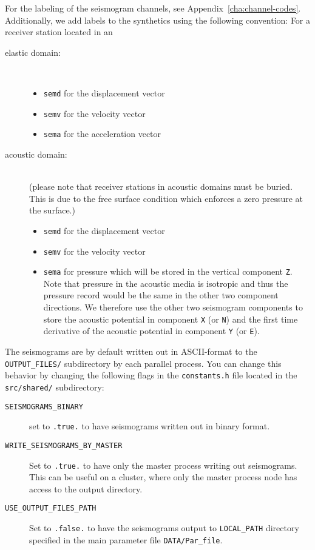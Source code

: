 For the labeling of the seismogram channels, see Appendix~\ref{cha:channel-codes}.
Additionally, we add labels to the synthetics using the following
convention: For a receiver station located in an
\begin{description}
\item [{elastic domain:}] ~
\begin{itemize}
\item \texttt{semd} for the displacement vector
\item \texttt{semv} for the velocity vector
\item \texttt{sema} for the acceleration vector
\end{itemize}
\item [{acoustic domain:}] ~\\
 (please note that receiver stations in acoustic domains must be buried.
This is due to the free surface condition which enforces a zero pressure
at the surface.)
\begin{itemize}
\item \texttt{semd} for the displacement vector
\item \texttt{semv} for the velocity vector
\item \texttt{sema} for pressure which will be stored in the vertical component
\texttt{Z}. Note that pressure in the acoustic media is isotropic
and thus the pressure record would be the same in the other two component
directions. We therefore use the other two seismogram components to
store the acoustic potential in component \texttt{X} (or \texttt{N})
and the first time derivative of the acoustic potential in component
\texttt{Y} (or \texttt{E}).
\end{itemize}
\end{description}
The seismograms are by default written out in ASCII-format to the
\texttt{OUTPUT\_FILES/} subdirectory by each parallel process. You
can change this behavior by changing the following flags in the \texttt{constants.h}
file located in the \texttt{src/shared/} subdirectory:
\begin{description}
\item [{\texttt{SEISMOGRAMS\_BINARY}}] set to \texttt{.true.} to have seismograms
written out in binary format.
\item [{\texttt{WRITE\_SEISMOGRAMS\_BY\_MASTER}}] Set to \texttt{.true.}
to have only the master process writing out seismograms. This can
be useful on a cluster, where only the master process node has access
to the output directory.
\item [{\texttt{USE\_OUTPUT\_FILES\_PATH}}] Set to \texttt{.false.} to
have the seismograms output to \texttt{LOCAL\_PATH} directory specified
in the main parameter file \texttt{DATA/Par\_file}.
\end{description}

